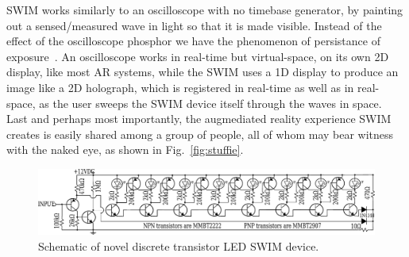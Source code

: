 \documentclass{sigchi-ext}
\begin{document}
SWIM works similarly to an oscilloscope with no timebase generator, by painting out a sensed/measured wave in light so that it is made visible. Instead of the effect of the oscilloscope phosphor we have the phenomenon of persistance of exposure~\cite{mann2015phenomenal}. An oscilloscope works in real-time but virtual-space, on its own 2D display, like most AR systems, while the SWIM uses a 1D display to produce an image like a 2D holograph, which is registered in real-time as well as in real-space, as the user sweeps the SWIM device itself through the waves in space. 
Last and perhaps most importantly, the augmediated reality experience SWIM
creates is easily shared among a group of people, all of whom may bear witness
with the naked eye, as shown in Fig.~\ref{fig:stuffie}.
\begin{figure}
 \centering
 \includegraphics[width=.5\textwidth]{schematic.pdf}
 \caption{Schematic of  novel discrete transistor LED SWIM device.}
 \label{fig:schematictransistors}
\end{figure}
\end{document}
